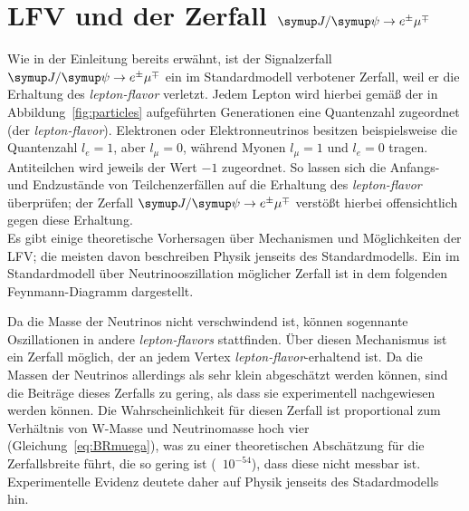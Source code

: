 \section{\texorpdfstring{LFV und der Zerfall $\signal$}{Jpsi to eµ}}
%
Wie in der Einleitung bereits erwähnt, ist der Signalzerfall $\signal$ ein im Standardmodell verbotener Zerfall, weil er die Erhaltung des \textit{lepton-flavor} verletzt. Jedem Lepton wird hierbei gemäß der in Abbildung~\ref{fig:particles} aufgeführten Generationen eine Quantenzahl zugeordnet (der \textit{lepton-flavor}). Elektronen oder Elektronneutrinos besitzen beispielsweise die Quantenzahl $l_e=1$, aber $l_\mu=0$, während Myonen $l_\mu=1$ und $l_e=0$ tragen. Antiteilchen wird jeweils der Wert $-1$ zugeordnet. So lassen sich die Anfangs- und Endzustände von Teilchenzerfällen auf die Erhaltung des \textit{lepton-flavor} überprüfen; der Zerfall $\signal$ verstößt hierbei offensichtlich gegen diese Erhaltung.\\
%
Es gibt einige theoretische Vorhersagen über Mechanismen und Möglichkeiten der LFV; die meisten davon beschreiben Physik jenseits des Standardmodells. Ein im Standardmodell über Neutrinooszillation möglicher Zerfall ist in dem folgenden Feynmann-Diagramm dargestellt.
%
\begin{figure}[H]
  \centering
  \label{fig:lfv_nu}
\end{figure}
%
Da die Masse der Neutrinos nicht verschwindend ist, können sogennante Oszillationen in andere \textit{lepton-flavors} stattfinden. Über diesen Mechanismus ist ein Zerfall möglich, der an jedem Vertex \textit{lepton-flavor}-erhaltend ist. Da die Massen der Neutrinos allerdings als sehr klein abgeschätzt werden können, sind die Beiträge dieses Zerfalls zu gering, als dass sie experimentell nachgewiesen werden können. Die Wahrscheinlichkeit für diesen Zerfall ist proportional zum Verhältnis von W-Masse und Neutrinomasse hoch vier (Gleichung~\ref{eq:BRmuega}), was zu einer theoretischen Abschätzung für die Zerfallsbreite führt, die so gering ist (~$10^{-54}$), dass diese nicht messbar ist. Experimentelle Evidenz deutete daher auf Physik jenseits des Stadardmodells hin.
